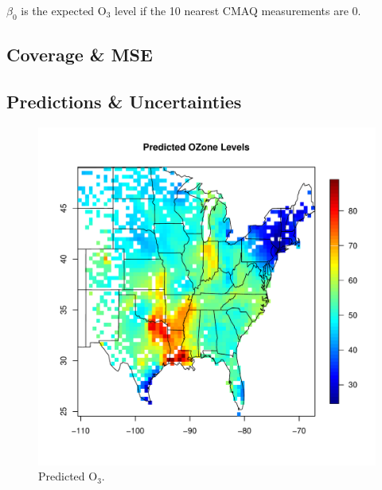 \documentclass{article}                                                   %
\begin{document}
    
    
    $\beta_0$ is the expected O$_3$ level if the 10 nearest CMAQ measurements are
    0. 

  \subsection{Coverage \& MSE }
    
  \subsection{Predictions \& Uncertainties}
    \begin{figure}\begin{center}
    \includegraphics{raw/center.pdf}
      \caption{Predicted O$_3$.}
    \end{center}\end{figure}
\end{document}
